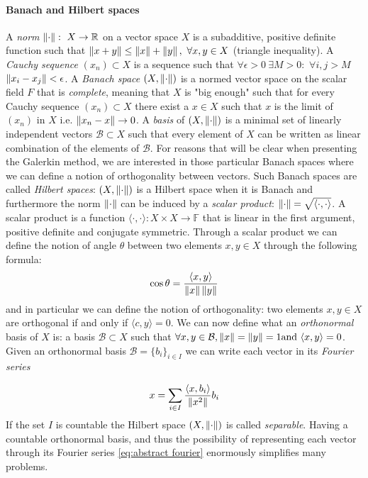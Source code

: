 \paragraph{Banach and Hilbert spaces}
A \textit{norm} $\left\lVert\cdot\right\rVert:\ X\to\mathbb R$ on a vector space $X$ is a subadditive, positive definite function such that $\left\lVert x+y\right\rVert\leq\left\lVert x\right\rVert +\left\lVert y\right\rVert,\ \forall x,y\in X$ (triangle inequality). A \textit{Cauchy sequence} $(x_n)\subset X$ is a sequence such that $\forall \epsilon>0\  \exists M>0: $ $\forall i,j>M$ $ \left\lVert x_i-x_j\right\rVert<\epsilon$. A \textit{Banach space} $(X, \left\lVert\cdot\right\rVert)$ is a normed vector space on the scalar field $F$ that is \textit{complete}, meaning that $X$ is "big enough" such that for every Cauchy sequence $(x_n)\subset X$ there exist a $x\in X$ such that $x$ is the limit of $(x_n)$ in $X$ i.e. $\left\lVert x_n-x\right\rVert\rightarrow 0$. A \textit{basis} of $(X, \left\lVert\cdot\right\rVert)$ is a minimal set of linearly independent vectors $\mathcal B \subset X$ such that every element of $X$ can be written as linear combination of the elements of $\mathcal B$. For reasons that will be clear when presenting the Galerkin method, we are interested in those particular Banach spaces where we can define a notion of orthogonality between vectors. Such Banach spaces are called \textit{Hilbert spaces}: $(X, \left\lVert\cdot\right\rVert )$ is a Hilbert space when it is Banach and furthermore the norm $ \left\lVert\cdot\right\rVert $ can be induced by a \textit{scalar product}: $\left\lVert\cdot\right\rVert = \sqrt{\langle\cdot,\cdot\rangle}$. A scalar product is a function $\langle\cdot,\cdot\rangle: X\times X \rightarrow \mathbb F$ that is linear in the first argument, positive definite and conjugate symmetric. Through a scalar product we can define the notion of angle $\theta$ between two elements $x, y \in X$ through the following formula: 
$$
\cos \theta = \frac{\langle x, y\rangle}{\left\lVert x\right\rVert \left\lVert y\right\rVert}
$$ 
and in particular we can define the notion of orthogonality: two elements  $x, y \in X$ are orthogonal if and only if $\langle c, y\rangle=0$. We can now define what an \textit{orthonormal} basis of $X$ is: a basis $\mathcal B \subset X$ such that $\forall x, y \in \mathcal B, \left\lVert x\right\rVert = \left\lVert y\right\rVert = 1 \text{and } \langle x, y\rangle = 0$. Given an orthonormal basis $\mathcal B = \{b_i\}_{i\in I}$ we can write each vector in its \textit{Fourier series} 

\begin{equation}\label{eq:abstract fourier}
	x = \sum_{i\in I} \frac{\langle x, b_i\rangle}{\left\lVert x^2\right\rVert}b_i
\end{equation}
If the set $I$ is countable the Hilbert space $(X, \left\lVert\cdot\right\rVert)$ is called \textit{separable}. Having a countable orthonormal basis, and thus the possibility of representing each vector through its Fourier series \ref{eq:abstract fourier} enormously simplifies many problems.

